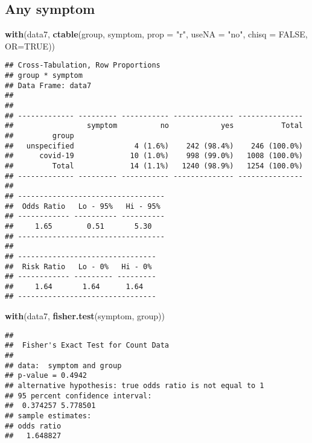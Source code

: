 \documentclass[
]{article}
\newenvironment{Shaded}{\begin{snugshade}}{\end{snugshade}}
\newcommand{\DataTypeTok}[1]{\textcolor[rgb]{0.13,0.29,0.53}{#1}}
\newcommand{\KeywordTok}[1]{\textcolor[rgb]{0.13,0.29,0.53}{\textbf{#1}}}
\newcommand{\NormalTok}[1]{#1}
\newcommand{\OtherTok}[1]{\textcolor[rgb]{0.56,0.35,0.01}{#1}}
\newcommand{\StringTok}[1]{\textcolor[rgb]{0.31,0.60,0.02}{#1}}
\begin{document}
\hypertarget{any-symptom}{%
\subsection{Any symptom}\label{any-symptom}}

\begin{Shaded}
\begin{Highlighting}[]
\KeywordTok{with}\NormalTok{(data7, }\KeywordTok{ctable}\NormalTok{(group, symptom, }\DataTypeTok{prop =} \StringTok{"r"}\NormalTok{, }\DataTypeTok{useNA =} \StringTok{"no"}\NormalTok{, }\DataTypeTok{chisq =} \OtherTok{FALSE}\NormalTok{, }\DataTypeTok{OR=}\OtherTok{TRUE}\NormalTok{))}
\end{Highlighting}
\end{Shaded}

\begin{verbatim}
## Cross-Tabulation, Row Proportions  
## group * symptom  
## Data Frame: data7  
## 
## 
## ------------- --------- ----------- -------------- ---------------
##                 symptom          no            yes           Total
##         group                                                     
##   unspecified              4 (1.6%)    242 (98.4%)    246 (100.0%)
##      covid-19             10 (1.0%)    998 (99.0%)   1008 (100.0%)
##         Total             14 (1.1%)   1240 (98.9%)   1254 (100.0%)
## ------------- --------- ----------- -------------- ---------------
## 
## ----------------------------------
##  Odds Ratio   Lo - 95%   Hi - 95% 
## ------------ ---------- ----------
##     1.65        0.51       5.30   
## ----------------------------------
## 
## --------------------------------
##  Risk Ratio   Lo - 0%   Hi - 0% 
## ------------ --------- ---------
##     1.64       1.64      1.64   
## --------------------------------
\end{verbatim}

\begin{Shaded}
\begin{Highlighting}[]
\KeywordTok{with}\NormalTok{(data7, }\KeywordTok{fisher.test}\NormalTok{(symptom, group))}
\end{Highlighting}
\end{Shaded}

\begin{verbatim}
## 
##  Fisher's Exact Test for Count Data
## 
## data:  symptom and group
## p-value = 0.4942
## alternative hypothesis: true odds ratio is not equal to 1
## 95 percent confidence interval:
##  0.374257 5.778501
## sample estimates:
## odds ratio 
##   1.648827
\end{verbatim}
\end{document}
